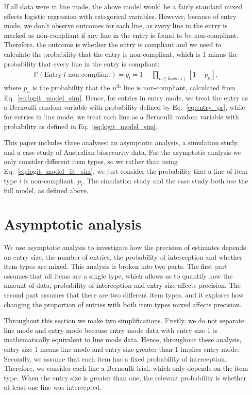 \documentclass{article}
\begin{document}
If all data were in line mode, the above model would be a fairly standard mixed effects logistic regression with categorical variables. However, because of entry mode, we don't observe outcomes for each line, as every line in the entry is marked as non-compliant if any line in the entry is found to be non-compliant. Therefore, the outcome is whether the entry is compliant and we need to calculate the probability that the entry is non-compliant, which is 1 minus the probability that every line in the entry is compliant:
\begin{align}
\mathbb{P}\left(\text{Entry } l \text{ non-compliant}\right) = q_l = 1-\prod_{n\in\text{lines}(l)}[1-p_n],\label{eq:entry_pr}
\end{align}
where \(p_n\) is the probability that the \(n^\text{th}\) line is non-compliant, calculated from Eq.~\eqref{eq:logit_model_sim}.
Hence, for entries in entry mode, we treat the entry  as a Bernoulli random variable with probability defined by Eq.~\eqref{eq:entry_pr}, while for entries in line mode, we treat each line as a Bernoulli random variable with probability as defined in Eq.~\eqref{eq:logit_model_sim}.


This paper includes three analyses: an asymptotic analysis,
 a simulation study, and a case study of Australian biosecurity data. For the asymptotic analysis we only consider different item types, so we rather than using Eq.~\eqref{eq:logit_model_fit_sim}, we just consider the probability that a line of item type \(i\) is non-compliant, \(p_i\). The simulation study and the case study both use the full model, as defined above. 


\section{Asymptotic analysis}\label{sec:asymptotic_analysis}
We use asymptotic analysis to investigate how the precision of estimates depends on entry size, the number of entries, the probability of interception and whether item types are mixed. This analysis is broken into two parts. The first part assumes that all items are a single type, which allows us to quantify how the amount of data, probability of interception and entry size affects precision. The second part assumes that there are two different item types, and it explores how changing the proportion of entries with both item types mixed affects precision.

Throughout this section we make two simplifications. Firstly, we do not separate line mode and entry mode because entry mode data with entry size 1 is mathematically equivalent to line mode data. Hence, throughout these analysis, entry size 1 means line mode and entry size greater than 1 implies entry mode. Secondly, we  assume that each item has a fixed probability of interception. Therefore, we consider each line a Bernoulli trial, which only depends on the item type. When the entry size is greater than one, the relevant probability is whether at least one line was intercepted.
\end{document}
